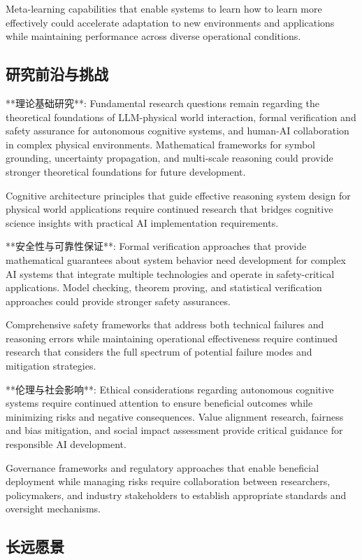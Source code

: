 Meta-learning capabilities that enable systems to learn how to learn more effectively could accelerate adaptation to new environments and applications while maintaining performance across diverse operational conditions.

\subsection{研究前沿与挑战}

**理论基础研究**:
Fundamental research questions remain regarding the theoretical foundations of LLM-physical world interaction, formal verification and safety assurance for autonomous cognitive systems, and human-AI collaboration in complex physical environments. Mathematical frameworks for symbol grounding, uncertainty propagation, and multi-scale reasoning could provide stronger theoretical foundations for future development.

Cognitive architecture principles that guide effective reasoning system design for physical world applications require continued research that bridges cognitive science insights with practical AI implementation requirements.

**安全性与可靠性保证**:
Formal verification approaches that provide mathematical guarantees about system behavior need development for complex AI systems that integrate multiple technologies and operate in safety-critical applications. Model checking, theorem proving, and statistical verification approaches could provide stronger safety assurances.

Comprehensive safety frameworks that address both technical failures and reasoning errors while maintaining operational effectiveness require continued research that considers the full spectrum of potential failure modes and mitigation strategies.

**伦理与社会影响**:
Ethical considerations regarding autonomous cognitive systems require continued attention to ensure beneficial outcomes while minimizing risks and negative consequences. Value alignment research, fairness and bias mitigation, and social impact assessment provide critical guidance for responsible AI development.

Governance frameworks and regulatory approaches that enable beneficial deployment while managing risks require collaboration between researchers, policymakers, and industry stakeholders to establish appropriate standards and oversight mechanisms.

\subsection{长远愿景}

